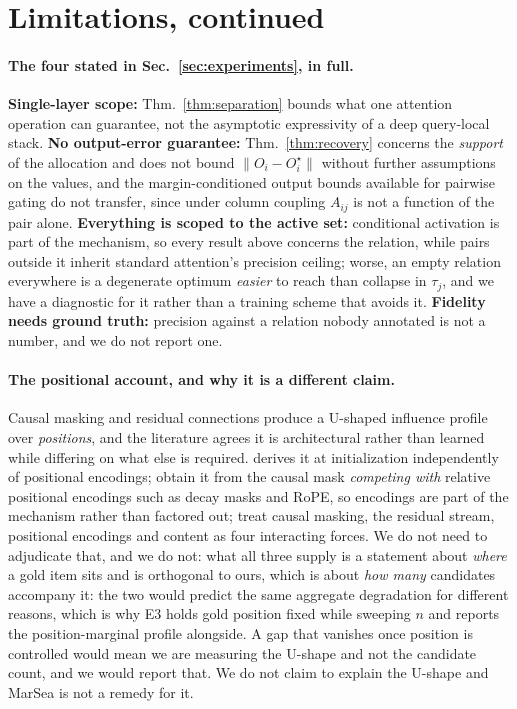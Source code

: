 \documentclass{article}
\begin{document}
\section{Limitations, continued}
\label{app:limitations}

\paragraph{The four stated in Sec.~\ref{sec:experiments}, in full.} \textbf{Single-layer scope:}
Thm.~\ref{thm:separation} bounds what one attention operation can guarantee, not the asymptotic
expressivity of a deep query-local stack. \textbf{No output-error guarantee:}
Thm.~\ref{thm:recovery} concerns the \emph{support} of the allocation and does not bound
$\|O_i - O_i^\star\|$ without further assumptions on the values, and
the margin-conditioned output bounds available for pairwise gating do not transfer, since under
column coupling $A_{ij}$ is not a function of the pair alone. \textbf{Everything is scoped to the
active set:} conditional activation is part of the mechanism, so every result above concerns
the relation, while pairs outside it inherit standard attention's precision ceiling; worse,
an empty relation everywhere is a degenerate optimum \emph{easier} to reach than collapse in
$\tau_j$, and we have a diagnostic for it rather than a training scheme that avoids it.
\textbf{Fidelity needs ground truth:} precision against a relation nobody annotated is not a
number, and we do not report one.

\paragraph{The positional account, and why it is a different claim.} Causal masking and residual
connections produce a U-shaped influence profile over \emph{positions}, and the literature agrees
it is architectural rather than learned while differing on what else is required.
\citet{chowdhury2026birth} derives it at initialization independently of positional encodings;
\citet{wu2025emergence} obtain it from the causal mask \emph{competing with} relative positional
encodings such as decay masks and RoPE, so encodings are part of the mechanism rather than
factored out; \citet{herasimchyk2026residual} treat causal masking, the residual stream,
positional encodings and content as four interacting forces. We do not need to adjudicate that,
and we do not: what all three supply is a statement about
\emph{where} a gold item sits and is orthogonal to ours, which is about \emph{how many}
candidates accompany it: the two would predict the same aggregate degradation for different
reasons, which is why E3 holds gold position fixed while sweeping $n$ and reports the
position-marginal profile alongside. A gap that vanishes once position is controlled would mean
we are measuring the U-shape and not the candidate count, and we would report that. We do not
claim to explain the U-shape and MarSea is not a remedy for it.
\end{document}
